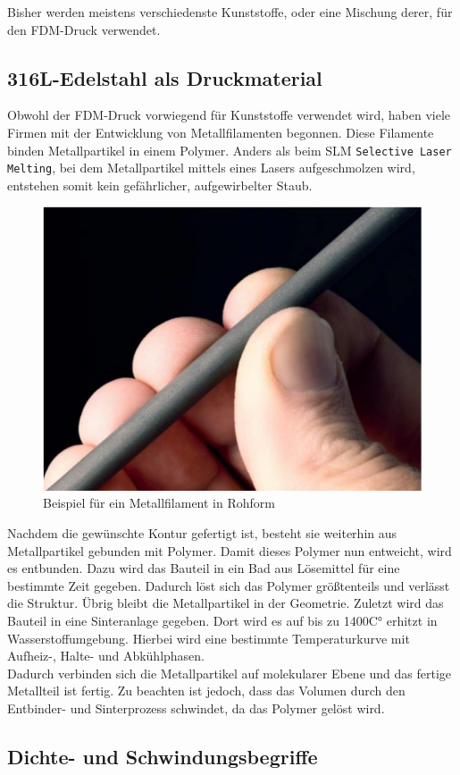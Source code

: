 Bisher werden meistens verschiedenste Kunststoffe, oder eine Mischung derer, für den FDM-Druck verwendet.

\subsection{316L-Edelstahl als Druckmaterial}

Obwohl der FDM-Druck vorwiegend für Kunststoffe verwendet wird, haben viele Firmen mit der Entwicklung von Metallfilamenten begonnen. Diese Filamente binden Metallpartikel in einem Polymer. Anders als beim SLM \texttt{Selective Laser Melting}, bei dem Metallpartikel mittels eines Lasers aufgeschmolzen wird, entstehen somit kein gefährlicher, aufgewirbelter Staub. \autocite{MetalAdditiveMan}
\begin{figure}[h]
	\centering
	\includegraphics[width=0.5\linewidth]{bilder/Beispiel_Metallfilament.png}
        \caption[Beispiel für ein Metallfilament in Rohform] {Beispiel für ein Metallfilament in Rohform \autocite{MetalAdditiveMan}}
	\label{fig:FilamentBeispiel}
\end{figure}

Nachdem die gewünschte Kontur gefertigt ist, besteht sie weiterhin aus Metallpartikel gebunden mit Polymer. Damit dieses Polymer nun entweicht, wird es entbunden. Dazu wird das Bauteil in ein Bad aus Lösemittel für eine bestimmte Zeit gegeben. Dadurch löst sich das Polymer größtenteils und verlässt die Struktur. Übrig bleibt die Metallpartikel in der Geometrie. Zuletzt wird das Bauteil in eine Sinteranlage gegeben. Dort wird es auf bis zu 1400C° erhitzt in Wasserstoffumgebung. Hierbei wird eine bestimmte Temperaturkurve mit Aufheiz-, Halte- und Abkühlphasen.\\
Dadurch verbinden sich die Metallpartikel auf molekularer Ebene und das fertige Metallteil ist fertig. Zu beachten ist jedoch, dass das Volumen durch den Entbinder- und Sinterprozess schwindet, da das Polymer gelöst wird.

\subsection{Dichte- und Schwindungsbegriffe}